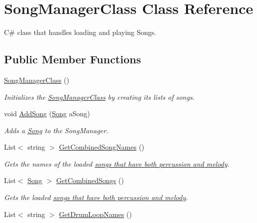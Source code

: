 \hypertarget{class_song_manager_class}{}\section{Song\+Manager\+Class Class Reference}
\label{class_song_manager_class}


C\# class that handles loading and playing Songs.  


\subsection*{Public Member Functions}
\begin{DoxyCompactItemize}
\item 
\hyperlink{group___s_m_construct_gacd94623c6402ad7c7af2f725265d0e4d}{Song\+Manager\+Class} ()
\begin{DoxyCompactList}\small\item\em Initializes the \hyperlink{class_song_manager_class}{Song\+Manager\+Class} by creating its lists of songs. \end{DoxyCompactList}\item 
void \hyperlink{group___s_m_pub_func_ga1a228cb2a64e55448ccf9d1d618f05b7}{Add\+Song} (\hyperlink{class_song}{Song} a\+Song)
\begin{DoxyCompactList}\small\item\em Adds a \hyperlink{class_song}{Song} to the Song\+Manager. \end{DoxyCompactList}\item 
List$<$ string $>$ \hyperlink{group___s_m_pub_func_ga87bd14c75666b13bd02510c5b7080784}{Get\+Combined\+Song\+Names} ()
\begin{DoxyCompactList}\small\item\em Gets the names of the loaded \hyperlink{group___song_group_DocSongCombined}{songs that have both percussion and melody}. \end{DoxyCompactList}\item 
List$<$ \hyperlink{class_song}{Song} $>$ \hyperlink{group___s_m_pub_func_ga413595693011bd6021dfd6eb941bf0e6}{Get\+Combined\+Songs} ()
\begin{DoxyCompactList}\small\item\em Gets the loaded \hyperlink{group___song_group_DocSongCombined}{songs that have both percussion and melody}. \end{DoxyCompactList}\item 
List$<$ string $>$ \hyperlink{group___s_m_pub_func_ga90e0aeb3117c5db6c667a23252bf45f6}{Get\+Drum\+Loop\+Names} ()

\end{DoxyCompactItemize}
